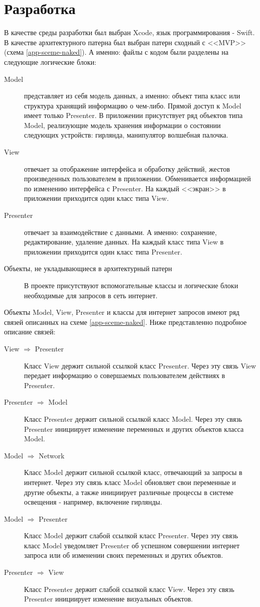  \section{Разработка}
 В качестве среды разработки был выбран Xcode, язык программирования - Swift. В качестве архитектурного патерна был выбран патерн сходный с <<MVP>> (схема \ref{app-sceme-naked}). А именно: файлы с кодом были разделены на следующие логические блоки:
 \begin{description}
 \item [Model] представляет из себя модель данных, а именно: объект типа класс или структура хранящий информацию о чем-либо. Прямой доступ к Model имеет только Presenter. В приложении присутствует ряд объектов типа Model, реализующие модель хранения информации о состоянии следующих устройств: гирлянда, манипулятор волшебная палочка.
 \item [View] отвечает за отображение интерфейса и обработку действий, жестов произведенных пользователем в приложении. Обменивается информацией по изменению интерфейса с Presenter. На каждый <<экран>> в приложении приходится один класс типа View.
 \item [Presenter] отвечает за взаимодействие с данными. А именно: сохранение, редактирование, удаление данных. На каждый класс типа View в приложении приходится один класс типа Presenter. 
\item [Объекты, не укладывающиеся в архитектурный патерн]В проекте присутствуют вспомогательные классы и логические блоки необходимые для запросов в сеть интернет.
 \end{description}
 Объекты Model, View, Presenter и классы для интернет запросов имеют ряд связей описанных на схеме \ref{app-sceme-naked}. Ниже представленно подробное описание связей:
  \begin{description}
  \item [View $\Rightarrow$ Presenter] Класс View держит сильной ссылкой класс Presenter. Через эту связь View передает информацию о совершаемых пользователем действиях в Presenter.
  \item [Presenter $\Rightarrow$ Model] Класс Presenter держит сильной ссылкой класс Model. Через эту связь Presenter инициирует изменение переменных и других объектов класса Model.
  \item [Model $\Rightarrow$ Network] Класс Model держит сильной ссылкой класс, отвечающий за запросы в интернет. Через эту связь класс Model обновляет свои переменные и другие объекты, а также инициирует различные процессы в системе освещения - например, включение гирлянды.
  \item [Model $\Rightarrow$ Presenter] Класс Model держит слабой ссылкой класс Presenter. Через эту связь класс Model уведомляет Presenter об успешном совершении интернет запроса или об изменении своих переменных и других объектов.
  \item [Presenter $\Rightarrow$ View] Класс Presenter держит слабой ссылкой класс View. Через эту связь Presenter инициирует изменение визуальных объектов.
   \end{description}
